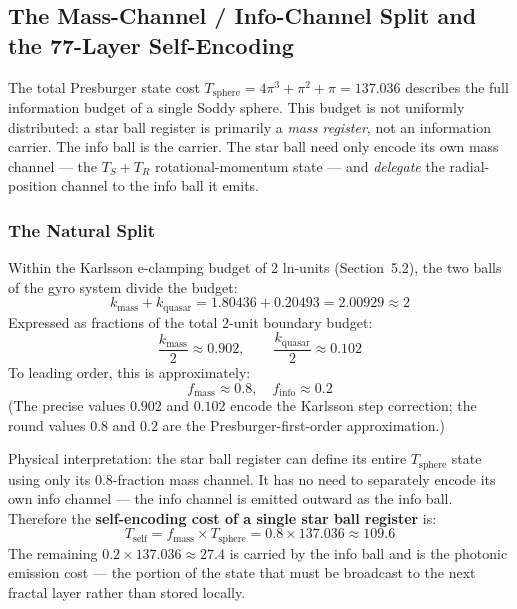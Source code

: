 

\subsection{The Mass-Channel / Info-Channel Split and the 77-Layer Self-Encoding}

  The total Presburger state cost $T_{\text{sphere}} = 4\pi^3 + \pi^2 + \pi = 137.036$
  describes the full information budget of a single Soddy sphere. This budget is not
  uniformly distributed: a star ball register is primarily a \emph{mass register},
  not an information carrier. The info ball is the carrier. The star ball need only
  encode its own mass channel --- the $T_S + T_R$ rotational-momentum state --- and
  \emph{delegate} the radial-position channel to the info ball it emits.

  \subsubsection{The Natural Split}

    Within the Karlsson e-clamping budget of 2 ln-units (Section~5.2), the two balls
    of the gyro system divide the budget:
    \[
      k_{\text{mass}} + k_{\text{quasar}} = 1.80436 + 0.20493 = 2.00929 \approx 2
    \]
    Expressed as fractions of the total 2-unit boundary budget:
    \[
      \frac{k_{\text{mass}}}{2} \approx 0.902,
      \qquad
      \frac{k_{\text{quasar}}}{2} \approx 0.102
    \]
    To leading order, this is approximately:
    \[
      \boxed{f_{\text{mass}} \approx 0.8, \quad f_{\text{info}} \approx 0.2}
    \]
    (The precise values $0.902$ and $0.102$ encode the Karlsson step correction;
    the round values $0.8$ and $0.2$ are the Presburger-first-order approximation.)

    Physical interpretation: the star ball register can define its entire
    $T_{\text{sphere}}$ state using only its $0.8$-fraction mass channel.
    It has no need to separately encode its own info channel --- the info channel
    is emitted outward as the info ball. Therefore the \textbf{self-encoding cost
    of a single star ball register} is:
    \[
      T_{\text{self}} = f_{\text{mass}} \times T_{\text{sphere}}
        = 0.8 \times 137.036 \approx 109.6
    \]
    The remaining $0.2 \times 137.036 \approx 27.4$ is carried by the info ball
    and is the photonic emission cost --- the portion of the state that must be
    broadcast to the next fractal layer rather than stored locally.

